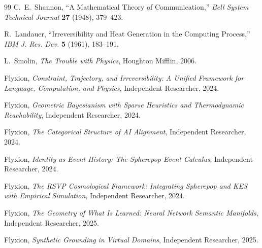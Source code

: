 \documentclass[12pt, oneside]{amsart}
\theoremstyle{plain}
\theoremstyle{definition}
\theoremstyle{remark}
\begin{document}
\begin{thebibliography}{99}
C.~E.~Shannon,
\newblock ``A Mathematical Theory of Communication,''
\newblock \textit{Bell System Technical Journal} \textbf{27} (1948), 379--423.

R.~Landauer,
\newblock ``Irreversibility and Heat Generation in the Computing Process,''
\newblock \textit{IBM J. Res. Dev.} \textbf{5} (1961), 183--191.


L.~Smolin,
\newblock \textit{The Trouble with Physics},
\newblock Houghton Mifflin, 2006.


Flyxion,
\newblock \textit{Constraint, Trajectory, and Irreversibility: A Unified Framework for Language, Computation, and Physics},
\newblock Independent Researcher, 2024.

Flyxion,
\newblock \textit{Geometric Bayesianism with Sparse Heuristics and Thermodynamic Reachability},
\newblock Independent Researcher, 2024.

Flyxion,
\newblock \textit{The Categorical Structure of AI Alignment},
\newblock Independent Researcher, 2024.

Flyxion,
\newblock \textit{Identity as Event History: The Spherepop Event Calculus},
\newblock Independent Researcher, 2024.

Flyxion,
\newblock \textit{The RSVP Cosmological Framework: Integrating Spherepop and KES with Empirical Simulation},
\newblock Independent Researcher, 2024.

Flyxion,
\newblock \textit{The Geometry of What Is Learned: Neural Network Semantic Manifolds},
\newblock Independent Researcher, 2025.

Flyxion,
\newblock \textit{Synthetic Grounding in Virtual Domains},
\newblock Independent Researcher, 2025.

\end{thebibliography}
\end{document}

